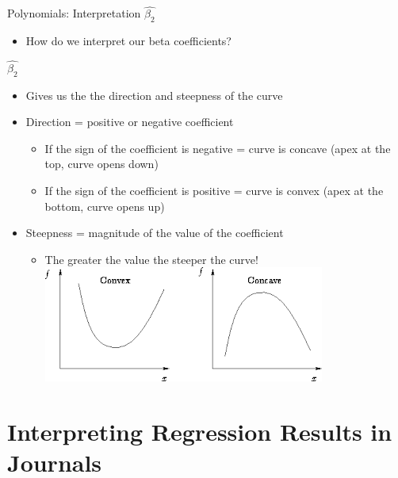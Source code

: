 \documentclass[
  8pt,
  ignorenonframetext,
  dvipsnames]{beamer}
\providecommand{\tightlist}{%
  \setlength{\itemsep}{0pt}\setlength{\parskip}{0pt}}
\renewcommand{\textbf}[1]{{\color{darkgray}\bfseries\fontfamily{Montserrat-TOsF}#1}}
\let\olditem\item
\renewcommand{\item}{%
  \olditem\vspace{4pt}
}
\begin{document}
\begin{frame}{Polynomials: Interpretation \(\hat{\beta_2}\)}
\protect\hypertarget{polynomials-interpretation-hatbeta_2}{}

\begin{itemize}
\tightlist
\item
  How do we interpret our beta coefficients?
\end{itemize}

\medskip

\textbf{\(\hat{\beta_2}\)}

\begin{itemize}
\tightlist
\item
  Gives us the the direction and steepness of the curve
\item
  Direction = positive or negative coefficient

  \begin{itemize}
  \tightlist
  \item
    If the sign of the coefficient is negative = curve is concave (apex
    at the top, curve opens down)
  \item
    If the sign of the coefficient is positive = curve is convex (apex
    at the bottom, curve opens up)
  \end{itemize}
\item
  Steepness = magnitude of the value of the coefficient

  \begin{itemize}
  \tightlist
  \item
    The greater the value the steeper the curve!
    \includegraphics{convex.png}
  \end{itemize}
\end{itemize}

\end{frame}

\hypertarget{interpreting-regression-results-in-journals}{%
\section{Interpreting Regression Results in
Journals}\label{interpreting-regression-results-in-journals}}
\end{document}
